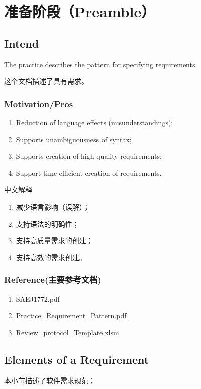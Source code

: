 \chapter{准备阶段（Preamble）}

\section{Intend}
The practice describes the pattern for specifying requirements.

这个文档描述了具有需求。

\subsection{Motivation/Pros}
\begin{enumerate}
	\item Reduction of language effects (misunderstandings);
	\item Supports unambiguousness of syntax;
	\item Supports creation of high quality requirements;
	\item Support time-efficient creation of requirements.
\end{enumerate}
中文解释
\begin{enumerate}[label=\textbullet]
	\item  减少语言影响（误解）；
	\item  支持语法的明确性；
	\item  支持高质量需求的创建；
	\item  支持高效的需求创建。
\end{enumerate}

\subsection{Reference(主要参考文档)}

	\begin{enumerate}[label=\alph*.]
		\item   SAEJ1772.pdf\cite{SAE}
		\item   Practice\_Requirement\_Pattern.pdf\cite{Pattern}
		\item Review\_protocol\_Template.xlsm\cite{Review}
	\end{enumerate}
 
\newpage
\section{Elements of a Requirement}
	本小节描述了软件需求规范；

